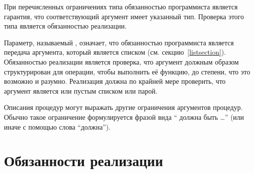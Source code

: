 При перечисленных ограничениях типа обязанностью программиста является гарантия, что
соответствующий аргумент имеет указанный тип. Проверка этого типа является обязанностью
реализации.\vspace{1.6mm}

Параметр, называемый , означает, что обязанностью программиста является передача
аргумента, который является списком (см. секцию~\ref{listsection}). Обязанностью реализации
является проверка, что аргумент должным образом структурирован для операции, чтобы выполнить её
функцию, до степени, что это возможно и разумно. Реализация должна по крайней мере проверить,
что аргумент является или пустым списком или парой.\vspace{1.6mm}

Описания процедур могут выражать другие ограничения аргументов процедур. Обычно такое
ограничение формулируется фразой вида `` должна быть \ldots'' (или иначе
с помощью слова ``должна'').\vspace{1.6mm}

\section{Обязанности реализации}\vspace{1.6mm}


